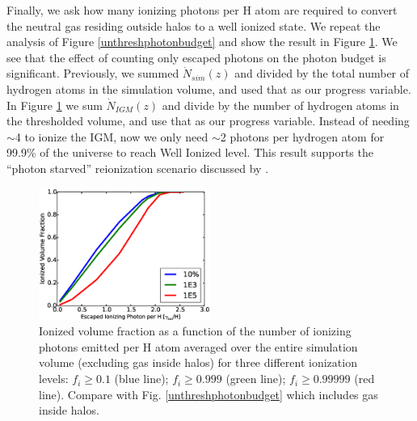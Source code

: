 Finally, we ask how many ionizing photons per H atom are required to convert the neutral gas residing outside halos to a well ionized state. We repeat the analysis of Figure \ref{unthreshphotonbudget} and show the result in Figure \ref{threshphotonbudget}.  We see that the effect of counting only escaped photons on the photon budget is significant.  Previously, we summed $\dot{N}_{sim}(z)$ and divided by the total number of hydrogen atoms in the simulation volume, and used that as our progress variable. 
In Figure \ref{threshphotonbudget} we sum $\dot{N}_{IGM}(z)$ and divide by the number of hydrogen atoms in the thresholded volume, and use that as our progress variable. 
Instead of needing $\sim$4 to ionize the IGM, now we only need $\sim$2 photons per hydrogen atom for 99.9\% of the universe to reach Well Ionized level. This result supports the ``photon starved'' reionization scenario discussed by \cite{BoltonHaehnelt2007}.  


\begin{figure}
	\includegraphics[width=0.5\textwidth]{thresh_photon_per_H.eps}
	\caption{Ionized volume fraction as a function of the number of ionizing photons emitted per H atom averaged over the entire simulation volume (excluding gas inside halos) for three different ionization levels: $f_i \geq 0.1$ (blue line);  $f_i \geq 0.999$ (green line); $f_i \geq 0.99999$ (red line). Compare with Fig. \ref{unthreshphotonbudget} which includes gas inside halos.}
	\label{threshphotonbudget}
\end{figure}

